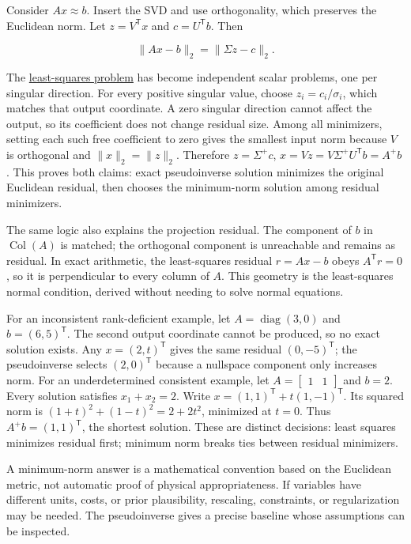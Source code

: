 Consider \(Ax\approx b\). Insert the SVD and use orthogonality, which preserves the Euclidean norm. Let \(z=V^\mathsf T x\) and \(c=U^\mathsf T b\). Then

\[
\|Ax-b\|_2=\|\Sigma z-c\|_2.
\]

The \hyperref[01-foundations-i-ch020-reflections-and-plane-rotations-build-qr-without-losing-lengths]{least-squares problem} has become independent scalar problems, one per singular direction. For every positive singular value, choose \(z_i=c_i/\sigma_i\), which matches that output coordinate. A zero singular direction cannot affect the output, so its coefficient does not change residual size. Among all minimizers, setting each such free coefficient to zero gives the smallest input norm because \(V\) is orthogonal and \(\|x\|_2=\|z\|_2\). Therefore \(z=\Sigma^+c\), \(x=Vz=V\Sigma^+U^\mathsf T b=A^+b\). This proves both claims: exact pseudoinverse solution minimizes the original Euclidean residual, then chooses the minimum-norm solution among residual minimizers.

The same logic also explains the projection residual. The component of \(b\) in \(\operatorname{Col}(A)\) is matched; the orthogonal component is unreachable and remains as residual. In exact arithmetic, the least-squares residual \(r=Ax-b\) obeys \(A^\mathsf T r=0\), so it is perpendicular to every column of \(A\). This geometry is the least-squares normal condition, derived without needing to solve normal equations.

For an inconsistent rank-deficient example, let \(A=\operatorname{diag}(3,0)\) and \(b=(6,5)^\mathsf T\). The second output coordinate cannot be produced, so no exact solution exists. Any \(x=(2,t)^\mathsf T\) gives the same residual \((0,-5)^\mathsf T\); the pseudoinverse selects \((2,0)^\mathsf T\) because a nullspace component only increases norm. For an underdetermined consistent example, let \(A=\begin{bmatrix}1&1\end{bmatrix}\) and \(b=2\). Every solution satisfies \(x_1+x_2=2\). Write \(x=(1,1)^\mathsf T+t(1,-1)^\mathsf T\). Its squared norm is \((1+t)^2+(1-t)^2=2+2t^2\), minimized at \(t=0\). Thus \(A^+b=(1,1)^\mathsf T\), the shortest solution. These are distinct decisions: least squares minimizes residual first; minimum norm breaks ties between residual minimizers.

A minimum-norm answer is a mathematical convention based on the Euclidean metric, not automatic proof of physical appropriateness. If variables have different units, costs, or prior plausibility, rescaling, constraints, or regularization may be needed. The pseudoinverse gives a precise baseline whose assumptions can be inspected.

